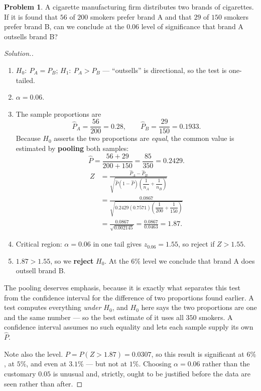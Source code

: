 \documentclass[11pt,a4paper]{article}
\theoremstyle{definition}
\newtheorem{problemx}{Problem}[section]
\newenvironment{problem}{\begin{problemx}}{\end{problemx}}
\newenvironment{solution}
  {\renewcommand{\qedsymbol}{}\begin{proof}[\textit{Solution}.]}
  {\end{proof}}
\begin{document}
\begin{problem}
A cigarette manufacturing firm distributes two brands of cigarettes. If it is found that
$56$ of $200$ smokers prefer brand A and that $29$ of $150$ smokers prefer brand B, can we
conclude at the $0.06$ level of significance that brand A outsells brand B?
\end{problem}

\begin{solution}
\begin{enumerate}
\item $H_0:\ P_A=P_B$; $H_1:\ P_A>P_B$ --- ``outsells'' is directional, so the test is
one-tailed.
\item $\alpha=0.06$.
\item The sample proportions are
\[\hat{P}_A=\frac{56}{200}=0.28,\qquad \hat{P}_B=\frac{29}{150}=0.1933.\]
Because $H_0$ asserts the two proportions are \emph{equal}, the common value is estimated by
\textbf{pooling} both samples:
\[\hat{P}=\frac{56+29}{200+150}=\frac{85}{350}=0.2429.\]
\begin{align*}
Z&=\frac{\hat{P}_A-\hat{P}_B}
{\sqrt{\hat{P}(1-\hat{P})\left(\dfrac{1}{n_A}+\dfrac{1}{n_B}\right)}}\\
&=\frac{0.0867}{\sqrt{0.2429(0.7571)\left(\dfrac{1}{200}+\dfrac{1}{150}\right)}}\\
&=\frac{0.0867}{\sqrt{0.002145}}=\frac{0.0867}{0.0463}=1.87.
\end{align*}
\item Critical region: $\alpha=0.06$ in one tail gives $z_{0.06}=1.55$, so reject if
$Z>1.55$.
\item $1.87>1.55$, so we \textbf{reject} $H_0$. At the $6\%$ level we conclude that brand A
does outsell brand B.
\end{enumerate}

The pooling deserves emphasis, because it is exactly what separates this test from the
confidence interval for the difference of two proportions found earlier. A test computes everything \emph{under $H_0$},
and $H_0$ here says the two proportions are one and the same number --- so the best estimate
of it uses all $350$ smokers. A confidence interval assumes no such equality and lets each
sample supply its own $\hat{P}$.

Note also the level. $P=P(Z>1.87)=0.0307$, so this result is significant at $6\%$, at $5\%$,
and even at $3.1\%$ --- but not at $1\%$. Choosing $\alpha=0.06$ rather than the customary
$0.05$ is unusual and, strictly, ought to be justified before the data are seen rather than
after.
\end{solution}
\end{document}
